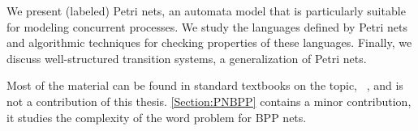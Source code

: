 \documentclass[../../diss.tex]{subfiles}
\begin{document}
We present (labeled) Petri nets, an automata model that is particularly suitable for modeling concurrent processes.
We study the languages defined by Petri nets and algorithmic techniques for checking properties of these languages.
Finally, we discuss well-structured transition systems, a generalization of Petri nets.

Most of the material can be found in standard textbooks on the topic, \eg~\cite{Reisig85}, and is not a contribution of this thesis.
\cref{Section:PNBPP} contains a minor contribution, it studies the complexity of the word problem for BPP nets.
\end{document}
